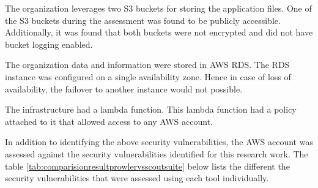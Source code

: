\par The organization leverages two S3 buckets for storing the application files.
One of the S3 buckets during the assessment was found to be publicly accessible.
Additionally, it was found that both buckets were not encrypted and did not have bucket logging enabled.

\par The organization data and information were stored in AWS RDS. The RDS instance was configured on a single availability zone.
Hence in case of loss of availability, the failover to another instance would not possible.

\par The infrastructure had a lambda function.
This lambda function had a policy attached to it that allowed access to any AWS account.


\par In addition to identifying the above security
vulnerabilities, the AWS account was assessed against the
security
vulnerabilities identified for this research work.
The table \ref{tab:comparisionresultprowlervsscoutsuite}
below lists the different the security
vulnerabilities that were assessed using each tool
individually.

